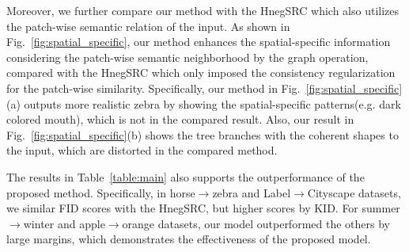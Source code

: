 \documentclass[letterpaper]{article} %
\begin{document}
Moreover, we further compare our method with the HnegSRC which also utilizes the patch-wise semantic relation of the input. As shown in Fig.~\ref{fig:spatial_specific}, our method enhances the spatial-specific information considering the patch-wise semantic neighborhood by the graph operation, compared with the HnegSRC which only imposed the consistency regularization for the patch-wise similarity. Specifically, our method in Fig.~\ref{fig:spatial_specific}(a) outputs more realistic zebra by showing the spatial-specific patterns(e.g. dark colored mouth), which is not in the compared result. Also, our result in Fig.~\ref{fig:spatial_specific}(b) shows the tree branches with the coherent shapes to the input, which are distorted in the compared method.

The results in Table~\ref{table:main} also supports the outperformance of the proposed method.
Specifically, in horse$\rightarrow$zebra and Label$\rightarrow$Cityscape datasets, we similar FID scores with the HnegSRC, but higher scores by KID.
For summer$\rightarrow$winter and apple$\rightarrow$orange datasets, our model outperformed the others by large margins, which demonstrates the effectiveness of the proposed model.
\end{document}
